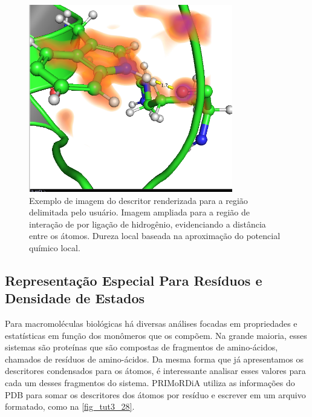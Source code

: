\documentclass[a4paper,11pt]{refart}
\begin{document}
\hspace*{-\leftmarginwidth}
\begin{minipage}{\fullwidth}
	\begin{figure}[H]
		\begin{center}
			\includegraphics[width=3.5in]{images/tut3_img28}
			\caption{Exemplo de imagem do descritor renderizada para a região delimitada pelo usuário. Imagem ampliada para a região de interação de por ligação de hidrogênio, evidenciando a distância entre os átomos. Dureza local baseada na aproximação do potencial químico local.}
			\label{fig_tut3_27}
		\end{center}
	\end{figure}
\end{minipage}

\subsection{Representação Especial Para Resíduos e Densidade de Estados}

Para macromoléculas biológicas há diversas análises focadas em propriedades e estatísticas em função dos monômeros que os compõem. Na grande maioria, esses sistemas são proteínas que são compostas de fragmentos de amino-ácidos, chamados de resíduos de amino-ácidos. Da mesma forma que já apresentamos os descritores condensados para os átomos, é interessante analisar esses valores para cada um desses fragmentos do sistema. PRIMoRDiA utiliza as informações do PDB para somar os descritores dos átomos por resíduo e escrever em um arquivo formatado, como na \autoref{fig_tut3_28}. 
\end{document}

